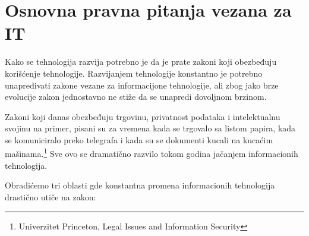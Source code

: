 \documentclass{article}
\begin{document}
\section{Osnovna pravna pitanja vezana za IT}

Kako se tehnologija razvija potrebno je da je prate zakoni koji obezbeđuju korišćenje tehnologije. Razvijanjem tehnologije konstantno je potrebno unapređivati zakone vezane za informacijone tehnologije, ali zbog jako brze evolucije zakon jednostavno ne stiže da se unapredi dovoljnom brzinom.

Zakoni koji danas obezbeđuju trgovinu, privatnost podataka i intelektualnu svojinu na primer, pisani su za vremena kada se trgovalo sa listom papira, kada se komuniciralo preko telegrafa i kada su se dokumenti kucali na kucaćim mašinama.\footnote{Univerzitet Princeton, Legal Issues and Information Security} Sve ovo se dramatično razvilo tokom godina jačanjem informacionih tehnologija.

Obradićemo tri oblasti gde konstantna promena informacionih tehnologija drastično utiče na zakon:
\end{document}
